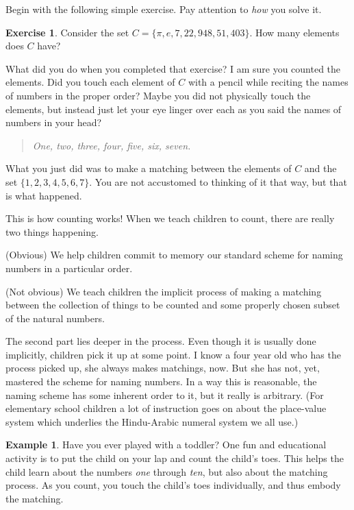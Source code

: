 \documentclass[12pt,letterpaper]{article}
\theoremstyle{definition}
\newtheorem{example}{Example}
\newtheorem{exercise}[question]{Exercise}
\begin{document}
Begin with the following simple exercise.
Pay attention to \emph{how} you solve it.
\begin{exercise}
Consider the set $C = \{ \pi, e, 7, 22, 948, 51, 403\}$.
How many elements does $C$ have?
\end{exercise}

\vspace{.5in}

What did you do when you completed that exercise?
I am sure you counted the elements.
Did you touch each element of $C$ with a pencil while reciting the names of numbers in the proper order?
Maybe you did not physically touch the elements, but instead just let your eye linger over each as you said the names of numbers in your head?
\begin{quote}
\emph{One, two, three, four, five, six, seven.}
\end{quote}
What you just did was to make a matching between the elements of $C$ and the set $\{1, 2, 3, 4, 5, 6, 7\}$.
You are not accustomed to thinking of it that way, but that is what happened.

This is how counting works!
When we teach children to count, there are really two things happening.
\begin{compactdesc}
\item[(Obvious)] We help children commit to memory our standard scheme for naming numbers in a particular order.
\item[(Not obvious)] We teach children the implicit process of making a matching between the collection of things to be counted and some properly chosen subset of the natural numbers.
\end{compactdesc}

The second part lies deeper in the process.
Even though it is usually done implicitly, children pick it up at some point.
I know a four year old who has the process picked up, she always makes matchings, now.
But she has not, yet, mastered the scheme for naming numbers. 
In a way this is reasonable, the naming scheme has some inherent order to it, but it really is arbitrary. 
(For elementary school children a lot of instruction goes on about the place-value system which underlies the Hindu-Arabic numeral system we all use.)

\begin{example}
Have you ever played with a toddler?
One fun and educational activity is to put the child on your lap and count the child's toes.
This helps the child learn about the numbers \emph{one} through \emph{ten}, but also about the matching process.
As you count, you touch the child's toes individually, and thus embody the matching.
\end{example}
\end{document}
